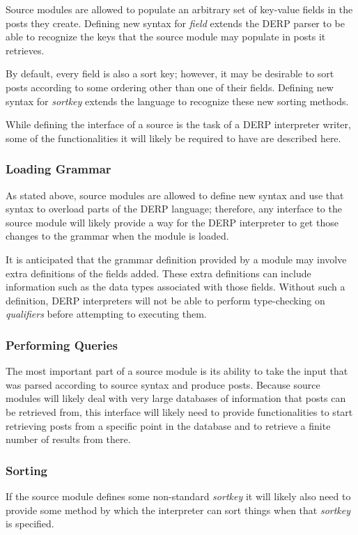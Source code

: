 Source modules are allowed to populate an arbitrary set of key-value fields in the posts 
they create. Defining new syntax for \emph{field} extends the DERP parser to be able to recognize 
the keys that the source module may populate in posts it retrieves.

By default, every field is also a sort key; however, it may be desirable to sort posts according 
to some ordering other than one of their fields. Defining new syntax for \emph{sortkey} extends the 
language to recognize these new sorting methods.

While defining the interface of a source is the task of a DERP interpreter writer, some of the 
functionalities it will likely be required to have are described here.

\subsubsection{Loading Grammar}
As stated above, source modules are allowed to define new syntax and use that syntax to overload parts 
of the DERP language; therefore, any interface to the source module will likely provide a way for the 
DERP interpreter to get those changes to the grammar when the module is loaded.

It is anticipated that the grammar definition provided by a module may involve extra definitions of 
the fields added. These extra definitions can include information such as the data types associated 
with those fields. Without such a definition, DERP interpreters will not be able to perform type-checking 
on \emph{qualifiers} before attempting to executing them.

\subsubsection{Performing Queries}
The most important part of a source module is its ability to take the input that was parsed according to 
source syntax and produce posts. Because source modules will likely deal with very large databases of 
information that posts can be retrieved from, this interface will likely need to provide functionalities 
to start retrieving posts from a specific point in the database and to retrieve a finite number of results 
from there.


\subsubsection{Sorting}
If the source module defines some non-standard \emph{sortkey} it will likely also need to provide some method by 
which the interpreter can sort things when that \emph{sortkey} is specified.


